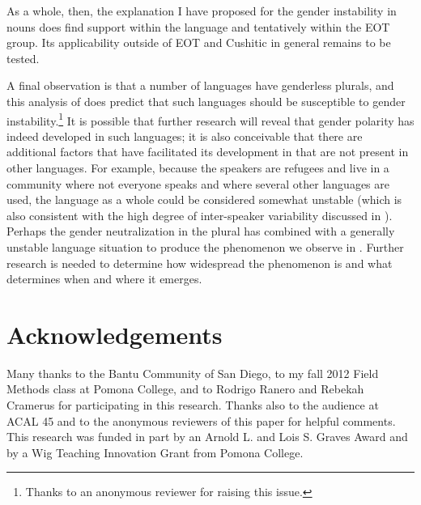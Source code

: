 \documentclass[output=paper,modfonts]{langscibook}
\begin{document}
As a whole, then, the explanation I have proposed for the gender instability in  nouns does find support within the language and tentatively within the EOT group. Its applicability outside of EOT and Cushitic in general remains to be tested.

A final observation is that a number of languages have genderless plurals, and this analysis of  does predict that such languages should be susceptible to gender instability.\footnote{Thanks to an anonymous reviewer for raising this issue.} It is possible that further research will reveal that gender polarity has indeed developed in such languages; it is also conceivable that there are additional factors that have facilitated its development in  that are not present in other languages. For example, because the speakers are refugees and live in a community where not everyone speaks  and where several other languages are used, the language as a whole could be considered somewhat unstable (which is also consistent with the high degree of inter-speaker variability discussed in \citealt{Paster2013}). Perhaps the gender neutralization in the plural has combined with a generally unstable language situation to produce the phenomenon we observe in . Further research is needed to determine how widespread the phenomenon is and what determines when and where it emerges.

\section*{Acknowledgements}
Many thanks to the  Bantu Community of San Diego, to my fall 2012 Field Methods class at Pomona College, and to Rodrigo Ranero and Rebekah Cramerus for participating in this research. Thanks also to the audience at ACAL 45 and to the anonymous reviewers of this paper for helpful comments. This research was funded in part by an Arnold L. and Lois S. Graves Award and by a Wig Teaching Innovation Grant from Pomona College.
 
\printbibliography[heading=subbibliography,notkeyword=this]
\end{document}
